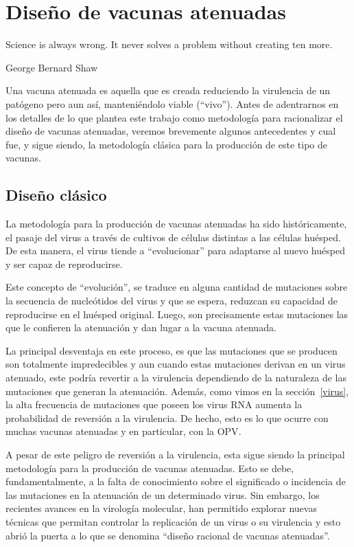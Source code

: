 \chapter{Dise\~no de vacunas atenuadas}
\label{diseno}
\epigraph{Science is always wrong. It never solves a problem without creating
ten more.}%
{George Bernard Shaw}

Una vacuna atenuada es aquella que es creada reduciendo la virulencia de un
pat\'ogeno pero aun as\'i, manteni\'endolo viable (``vivo''). Antes de
adentrarnos en los detalles de lo que plantea este trabajo como metodolog\'ia
para racionalizar el dise\~no de vacunas atenuadas, veremos brevemente algunos
antecedentes y cual fue, y sigue siendo, la metodolog\'ia cl\'asica para la
producci\'on de este tipo de vacunas.

\section{Dise\~no cl\'asico}

La metodolog\'ia para la producci\'on de vacunas atenuadas ha sido
hist\'oricamente, el pasaje del virus a trav\'es de cultivos de c\'elulas
distintas a las c\'elulas hu\'esped. De esta manera, el virus tiende a
``evolucionar'' para adaptarse al nuevo hu\'esped y ser capaz de reproducirse.

Este concepto de ``evoluci\'on'', se traduce en alguna cantidad de mutaciones
sobre la secuencia de nucle\'otidos del virus y que se espera, reduzcan su
capacidad de reproducirse en el hu\'esped original. Luego, son precisamente
estas mutaciones las que le confieren la atenuaci\'on y dan lugar a la vacuna
atenuada.

La principal desventaja en este proceso, es que las mutaciones que se producen
son totalmente impredecibles y aun cuando estas mutaciones derivan en un virus
atenuado, este podr\'ia revertir a la virulencia dependiendo de la naturaleza de
las mutaciones que generan la atenuaci\'on\cite{Badgett02}. Adem\'as, como vimos
en la secci\'on~\ref{virus}, la alta frecuencia de mutaciones que poseen los
virus \ac{RNA} aumenta la probabilidad de reversi\'on a la virulencia. De hecho,
esto es lo que ocurre con muchas vacunas atenuadas y en particular, con la
\ac{OPV}.

A pesar de este peligro de reversi\'on a la virulencia, esta sigue siendo la
principal metodolog\'ia para la producci\'on de vacunas atenuadas. Esto se debe,
fundamentalmente, a la falta de conocimiento sobre el significado o incidencia
de las mutaciones en la atenuaci\'on de un determinado virus. Sin embargo, los
recientes avances en la virolog\'ia molecular, han permitido explorar nuevas
t\'ecnicas que permitan controlar la replicaci\'on de un virus o su virulencia y
esto abri\'o la puerta a lo que se denomina ``dise\~no racional de vacunas
atenuadas''\cite{Lauring10}.

